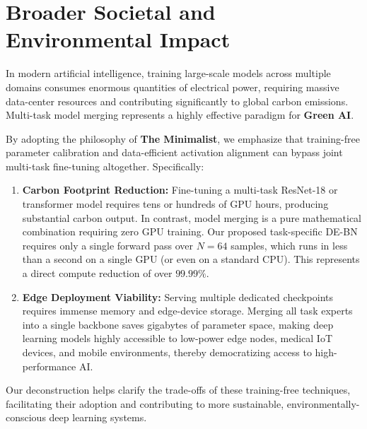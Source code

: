 \documentclass{article}
\begin{document}
\section{Broader Societal and Environmental Impact}
\label{sec:appendix_societal}
In modern artificial intelligence, training large-scale models across multiple domains consumes enormous quantities of electrical power, requiring massive data-center resources and contributing significantly to global carbon emissions. Multi-task model merging represents a highly effective paradigm for \textbf{Green AI}.

By adopting the philosophy of \textbf{The Minimalist}, we emphasize that training-free parameter calibration and data-efficient activation alignment can bypass joint multi-task fine-tuning altogether.
Specifically:
\begin{enumerate}
    \item \textbf{Carbon Footprint Reduction:} Fine-tuning a multi-task ResNet-18 or transformer model requires tens or hundreds of GPU hours, producing substantial carbon output. In contrast, model merging is a pure mathematical combination requiring zero GPU training. Our proposed task-specific DE-BN requires only a single forward pass over $N=64$ samples, which runs in less than a second on a single GPU (or even on a standard CPU). This represents a direct compute reduction of over $99.99\%$.
    \item \textbf{Edge Deployment Viability:} Serving multiple dedicated checkpoints requires immense memory and edge-device storage. Merging all task experts into a single backbone saves gigabytes of parameter space, making deep learning models highly accessible to low-power edge nodes, medical IoT devices, and mobile environments, thereby democratizing access to high-performance AI.
\end{enumerate}
Our deconstruction helps clarify the trade-offs of these training-free techniques, facilitating their adoption and contributing to more sustainable, environmentally-conscious deep learning systems.
\end{document}
